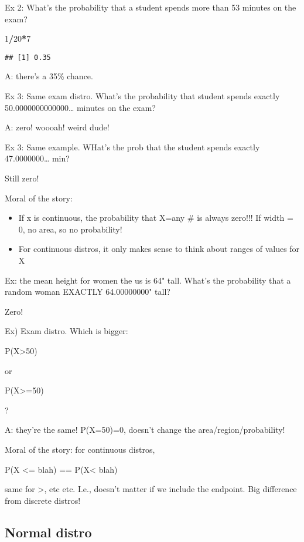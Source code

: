 \documentclass[]{article}
\newenvironment{Shaded}{\begin{snugshade}}{\end{snugshade}}
\newcommand{\DecValTok}[1]{\textcolor[rgb]{0.00,0.00,0.81}{#1}}
\newcommand{\OperatorTok}[1]{\textcolor[rgb]{0.81,0.36,0.00}{\textbf{#1}}}
\providecommand{\tightlist}{%
  \setlength{\itemsep}{0pt}\setlength{\parskip}{0pt}}
\begin{document}
Ex 2: What's the probability that a student spends more than 53 minutes
on the exam?

\begin{Shaded}
\begin{Highlighting}[]
\DecValTok{1}\OperatorTok{/}\DecValTok{20}\OperatorTok{*}\DecValTok{7}
\end{Highlighting}
\end{Shaded}

\begin{verbatim}
## [1] 0.35
\end{verbatim}

A: there's a 35\% chance.

Ex 3: Same exam distro. What's the probability that student spends
exactly 50.0000000000000\ldots{} minutes on the exam?

A: zero! woooah! weird dude!

Ex 3: Same example. WHat's the prob that the student spends exactly
47.0000000\ldots{} min?

Still zero!

Moral of the story:

\begin{itemize}
\tightlist
\item
  If x is continuous, the probability that X=any \# is always zero!!! If
  width = 0, no area, so no probability!
\item
  For continuous distros, it only makes sense to think about ranges of
  values for X
\end{itemize}

Ex: the mean height for women the us is 64" tall. What's the probability
that a random woman EXACTLY 64.00000000" tall?

Zero!

Ex) Exam distro. Which is bigger:

P(X\textgreater{}50)

or

P(X\textgreater{}=50)

?

A: they're the same! P(X=50)=0, doesn't change the
area/region/probability!

Moral of the story: for continuous distros,

P(X \textless{}= blah) == P(X\textless{} blah)

same for \textgreater{}, etc etc. I.e., doesn't matter if we include the
endpoint. Big difference from discrete distros!

\hypertarget{normal-distro}{%
\subsection{Normal distro}\label{normal-distro}}
\end{document}
